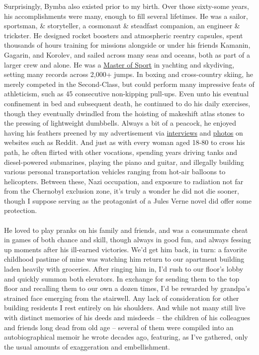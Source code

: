 \documentclass[twoside,10pt]{article}
\begin{document}
\begin{article*}
Surprisingly, Bymba also existed prior to my birth. Over those sixty-some years, his accomplishments were many, enough to fill several lifetimes. He was a sailor, sportsman, \& storyteller, a cosmonaut \& steadfast companion, an engineer \& trickster. He designed rocket boosters and atmospheric reentry capsules, spent thousands of hours training for missions alongside or under his friends Kamanin, Gagarin, and Korolev, and sailed across many seas and oceans, both as part of a larger crew and alone. He was a \href{https://en.wikipedia.org/wiki/Unified_Sports_Classification_System_of_the_USSR_and_Russia#Athletes}{Master of Sport} in yachting and skydiving, setting many records across 2,000+ jumps. In boxing and cross-country skiing, he merely competed in the Second-Class, but could perform many impressive feats of athleticism, such as 45 consecutive non-kipping pull-ups. Even unto his eventual confinement in bed and subsequent death, he continued to do his daily exercises, though they eventually dwindled from the hoisting of makeshift atlas stones to the pressing of lightweight dumbbells. Always a bit of a peacock, he enjoyed having his feathers preened by my advertisement via \href{https://www.reddit.com/r/IAmA/comments/etu2s/i_was_born_in_shchigry_ru_in_1932_i_worked_as_a/}{interviews} and \href{https://www.reddit.com/r/OldSchoolCool/comments/8473rx/what_56_years_of_marriage_does_to_a_couple/}{photos} on websites such as Reddit. And just as with every woman aged 18-80 to cross his path, he often flirted with other vocations, spending years driving tanks and diesel-powered submarines, playing the piano and guitar, and illegally building various personal transportation vehicles ranging from hot-air balloons to helicopters. Between these, Nazi occupation, and exposure to radiation not far from the Chernobyl exclusion zone, it’s truly a wonder he did not die sooner, though I suppose serving as the protagonist of a Jules Verne novel did offer some protection.
\\\\
He loved to play pranks on his family and friends, and was a consummate cheat in games of both chance and skill, though always in good fun, and always fessing up moments after his ill-earned victories. We’d get him back, in turn: a favorite childhood pastime of mine was watching him return to our apartment building laden heavily with groceries. After ringing him in, I’d rush to our floor’s lobby and quickly summon both elevators. In exchange for sending them to the top floor and recalling them to our own a dozen times, I’d be rewarded by grandpa’s strained face emerging from the stairwell. Any lack of consideration for other building residents I rest entirely on his shoulders. And while not many still live with distinct memories of his deeds and misdeeds – the children of his colleagues and friends long dead from old age – several of them were compiled into an autobiographical memoir he wrote decades ago, featuring, as I’ve gathered, only the usual amounts of exaggeration and embellishment.
\\


\end{article*}
\end{document}
